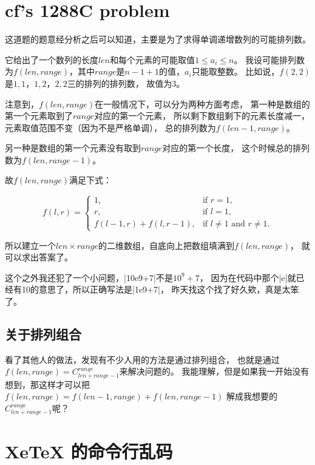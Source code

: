 
\section{cf's 1288C problem}

这道题的题意经分析之后可以知道，主要是为了求得单调递增数列的可能排列数。

它给出了一个数列的长度$len$和每个元素的可能取值$1\le a_i\le n$。
我设可能排列数为$f(len, range)$，其中$range$是$n-1+1$的值，$a_i$只能取整数。
比如说，$f(2, 2)$是${1, 1}$，${1, 2}$，${2, 2}$三的排列的排列数，
故值为3。

注意到，$f(len, range)$在一般情况下，可以分为两种方面考虑，
第一种是数组的第一个元素取到了$range$对应的第一个元素，
所以剩下数组剩下的元素长度减一，元素取值范围不变（因为不是严格单调），
总的排列数为$f(len-1, range)$。

另一种是数组的第一个元素没有取到$range$对应的第一个长度，
这个时候总的排列数为$f(len, range-1)$。

故$f(len, range)$满足下式：

\[f(l, r)=
\begin{cases}
    1, & \text{if } r=1, \\
    r, & \text{if } l=1,\\
    f(l-1, r) + f(l, r-1), & \text{if } l\ne 1 \text{ and } r\ne1.
\end{cases}\]

所以建立一个$len\times range$的二维数组，自底向上把数组填满到$f(len, range)$，
就可以求出答案了。

这个之外我还犯了一个小问题，\vb|10e9+7|不是$10^9+7$，
因为在代码中那个\vb|e|就已经有10的意思了，所以正确写法是\vb|1e9+7|，
昨天找这个找了好久欸，真是太笨了。

\subsection{关于排列组合}

看了其他人的做法，发现有不少人用的方法是通过排列组合，
也就是通过$f(len, range)=C_{len+range-1}^{range}$来解决问题的。
我能理解，但是如果我一开始没有想到，那这样才可以把
$f(len, range)=f(len-1, range) + f(len, range-1)$
解成我想要的$C_{len+range-1}^{range}$呢？


\section{XeTeX 的命令行乱码}

